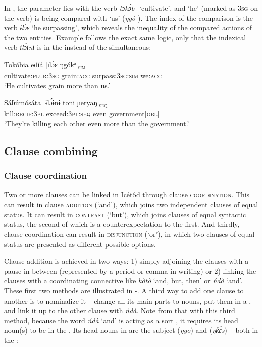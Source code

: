 In , the parameter lies with the verb \textit{tɔk\'{ɔ}b-} ‘cultivate’, and ‘he’ (marked as 3\textsc{sg} on the verb) is being compared with ‘us’ (\textit{ŋgó-}). The index of the comparison is the verb \textit{ɨl\'{ɔ}{\Í}ɛ} ‘he surpassing’, which reveals the inequality of the compared actions of the two entities. Example  follows the exact same logic, only that the indexical verb \textit{ɨl\'{ɔ}ɨnɨ} is in the  instead of the simultaneous: 



\ea\label{ex:syn:59}
\gll Tokóbia     eɗíá        [ɪl\'{ɔ}{\Í}ɛ     ŋgókᵃ]\textsc{\textsubscript{sim}} \\
cultivate:\textsc{plur:3sg} grain:\textsc{acc} surpass:\textsc{3sg:sim} we:\textsc{acc}    \\
\glt ‘He cultivates grain more than us.’ 
\z




\ea\label{ex:syn:60}
\gll Sáɓúmósáta     [ɨl\'{ɔ}ɨnɨ          toni  ɲeryaŋ]\textsc{\textsubscript{seq}} \\
kill:\textsc{recip:3pl} exceed:\textsc{3pl:seq} even government[\textsc{obl}]    \\
\glt ‘They’re killing each other even more than the government.’ 
\z






\subsection{Clause combining}\label{sec:10.8}
\subsubsection{Clause coordination}\label{sec:10.8.1}

Two or more clauses can be linked in Icétôd through clause \textsc{coordination}. This can result in clause \textsc{addition} (‘and’), which joins two independent clauses of equal status. It can result in \textsc{contrast} (‘but’), which joins clauses of equal syntactic status, the second of which is a counterexpectation to the first. And thirdly, clause coordination can result in \textsc{disjunction} (‘or’), in which two clauses of equal status are presented as different possible options.

Clause addition is achieved in two ways: 1) simply adjoining the clauses with a pause in between (represented by a period or comma in writing) or 2) linking the clauses with a coordinating connective like \textit{kòtò} ‘and, but, then’ or \textit{ńdà} ‘and’. These first two methods are illustrated in -. A third way to add one clause to another is to nominalize it – change all its main parts to nouns, put them in a , and link it up to the other clause with \textit{ńdà}. Note from  that with this third method, because the word \textit{ńdà} ‘and’ is acting as a sort , it requires its head noun(s) to be in the . Its head nouns in  are the subject (\textit{ŋgo}) and  (\textit{ŋƙ\'{ɛ}s{\Í}}) – both in the :




